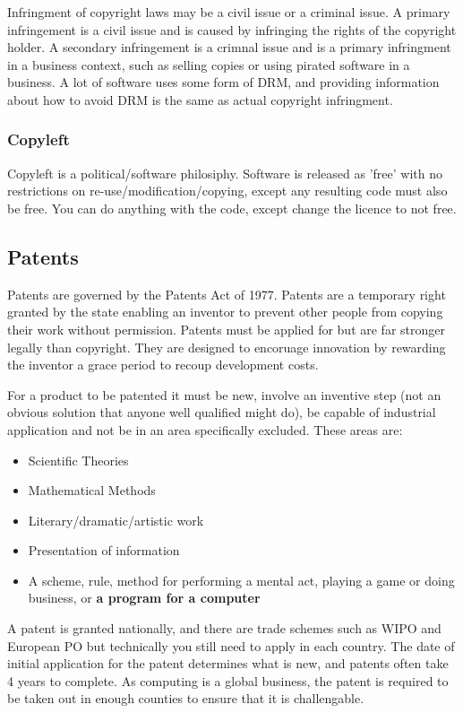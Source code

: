 \documentclass{article}
\begin{document}
	Infringment of copyright laws may be a civil issue or a criminal issue. A primary infringement is a civil issue and is caused by infringing the rights of the copyright holder. A secondary infringement is a crimnal issue and is a primary infringment in a business context, such as selling copies or using pirated software in a business. A lot of software uses some form of DRM, and providing information about how to avoid DRM is the same as actual copyright infringment.
	
	\subsubsection{Copyleft}
	Copyleft is a political/software philosiphy. Software is released as 'free' with no restrictions on re-use/modification/copying, except any resulting code must also be free. You can do anything with the code, except change the licence to not free. 
	
	\subsection{Patents}	
	Patents are governed by the Patents Act of 1977. Patents are a temporary right granted by the state enabling an inventor to prevent other people from copying their work without permission. Patents must be applied for but are far stronger legally than copyright. They are designed to encoruage innovation by rewarding the inventor a grace period to recoup development costs.
	
	\par 
	For a product to be patented it must be new, involve an inventive step (not an obvious solution that anyone well qualified might do), be capable of industrial application and not be in an area specifically excluded. These areas are:
	\begin{itemize}
	\item Scientific Theories
	\item Mathematical Methods
	\item Literary/dramatic/artistic work
	\item Presentation of information
	\item A scheme, rule, method for performing a mental act, playing a game or doing business, or \textbf{a program for a computer}
	\end{itemize}
	
	A patent is granted nationally, and there are trade schemes such as WIPO and European PO but technically you still need to apply in each country. The date of initial application for the patent determines what is new, and patents often take 4 years to complete. As computing is a global business, the patent is required to be taken out in enough counties to ensure that it is challengable.
	
\end{document}
